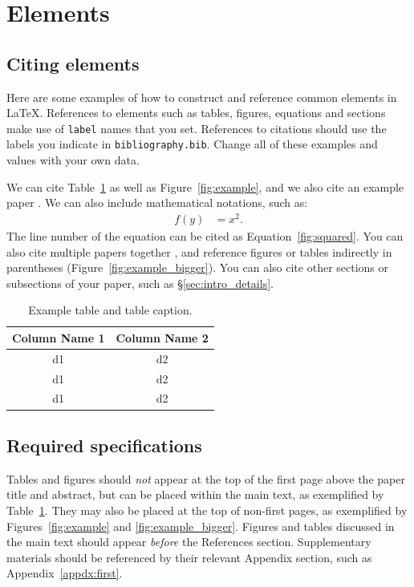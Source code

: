 \documentclass{anthology-ch}         %
\begin{document}
\section{Elements}

\subsection{Citing elements}

Here are some examples of how to construct and reference common elements in LaTeX. References to elements such as tables, figures, equations and sections make use of \texttt{label} names that you set. References to citations should use the labels you indicate in \texttt{bibliography.bib}. Change all of these examples and values with your own data. 

We can cite Table~\ref{tab:example} as well as Figure~\ref{fig:example}, and we also cite an example paper \cite{tettoni2024discoverability}.
We can also include mathematical notations, such as:
\begin{align}
f(y) &= x^2. \label{fig:squared}
\end{align}
The line number of the equation can be cited as
Equation~\ref{fig:squared}. You can also cite multiple papers together \cite{barré2024latent, levenson2024textual, bambaci2024steps}, and reference figures or tables indirectly in parentheses (Figure~\ref{fig:example_bigger}). You can also cite other sections or subsections of your paper, such as \S\ref{sec:intro_details}. 


\begin{table}[h]
  \centering 
  \begin{tabular}{cc}
    \toprule
    Column Name 1 & Column Name 2\\
    \midrule
    d1 & d2 \\
    d1 & d2 \\
    d1 & d2 \\
    \bottomrule
  \end{tabular}
  \caption{Example table and table caption.}
  \label{tab:example}
\end{table}


\subsection{Required specifications}

Tables and figures should \textit{not} appear at the top of the first page above the paper title and abstract, but can be placed within the main text, as exemplified by Table~\ref{tab:example}. They may also be placed at the top of non-first pages, as exemplified by Figures~\ref{fig:example} and \ref{fig:example_bigger}. Figures and tables discussed in the main text should appear \textit{before} the References section. Supplementary materials should be referenced by their relevant Appendix section, such as Appendix~\ref{appdx:first}. 
\end{document}
